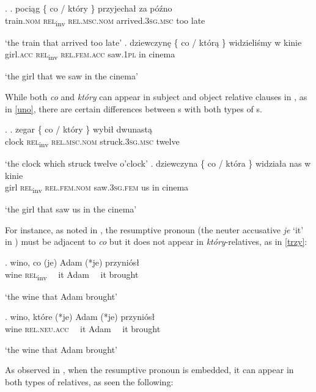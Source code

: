 \ex. \label{Pol:inv-co}
\ag. 
poci\k{a}g \{ co / {kt\'ory \}} przyjecha\l {} za p\'o\'zno\\
train.\textsc{nom} {} \textsc{rel}\textsubscript{inv} {} \textsc{rel.msc.nom}  arrived.\textsc{3sg.msc} too late\\
\strut `the train that arrived too late'
\bg.
dziewczyn\k{e} \{ co / {kt\'or\k{a} \}} widzieli\'smy w kinie\\
girl.\textsc{acc} {} \textsc{rel}\textsubscript{inv} {} \textsc{rel.fem.acc} saw.\textsc{1pl} in cinema\\
\strut `the girl that we saw in the cinema'  

While both \textit{co} and \textit{kt\'ory} can appear in subject and object relative clauses in , as in \ref{uno}, there are certain differences between s with both types of s.

\ex.\label{uno} 
\ag. zegar \{ co / {kt\'ory \}} wybi\l {} dwunast\k{a}\\
clock {} \textsc{rel}\textsubscript{inv} {} \textsc{rel.msc.nom} struck.\textsc{3sg.msc} twelve\\
\strut `the clock which struck twelve o'clock'
\bg.
dziewczyna \{ co / {kt\'ora \}} widzia\l a nas w kinie\\
girl {} \textsc{rel}\textsubscript{inv} {} \textsc{rel.fem.nom} saw.\textsc{3sg.fem} us in cinema\\
\strut `the girl that saw us in the cinema'  

For instance, as noted in \cite{Mykowiecka2001}, the resumptive pronoun (the neuter accusative \textit{je} `it' in ) must be adjacent to \textit{co} but it does not appear in \textit{kt\'ory}-relatives, as in \ref{trzy}: 

\exg.
 wino, co (je) Adam (*je) przyni\'os\l\\
wine \textsc{rel}\textsubscript{inv} \ \ it Adam \ \ it brought\\
\strut `the wine that Adam brought'\label{dwa}

\exg.
wino, kt\'ore (*je) Adam (*je) przyni\'os\l\\
wine \textsc{rel.neu.acc} \ \ it Adam \ \ it brought\\
\strut `the wine that Adam brought'\label{trzy}

As observed in \cite{Szczegielniak2005}, when the resumptive pronoun is embedded, it can appear in both types of relatives, as seen the following:

